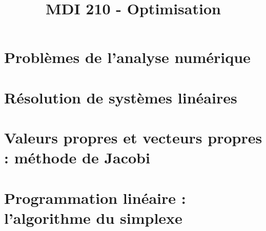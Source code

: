 \documentclass[a4paper,9pt]{article}
\title{\vspace{-1.2cm} MDI 210 - Optimisation}
\date{}
\begin{document}
\maketitle

\vspace{-1.5cm}

\section{Problèmes de l'analyse numérique}

	

\section{Résolution de systèmes linéaires}

	

\section{Valeurs propres et vecteurs propres : méthode de Jacobi}

	

\section{Programmation linéaire : l'algorithme du simplexe}

	
\end{document}
